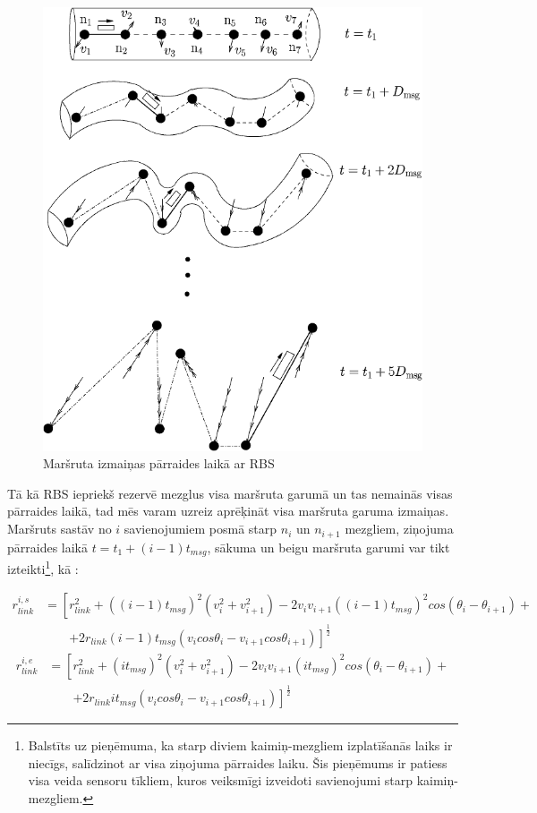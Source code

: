 \begin{figure}
\centering
\includegraphics[scale=0.40]{./graph/dpRBS.png}
\caption{Maršruta izmaiņas pārraides laikā ar RBS \cite{qoS_mobility}}
\label{fig:dpRBS}
\end{figure}

Tā kā RBS iepriekš rezervē mezglus visa maršruta garumā un tas nemainās visas pārraides laikā, tad mēs varam uzreiz aprēķināt visa maršruta garuma izmaiņas. Maršruts sastāv no $i$ savienojumiem posmā starp $n_{i}$ un $n_{i+1}$ mezgliem, ziņojuma pārraides laikā $t = t_{1}+(i-1)t_{msg}$, sākuma un beigu maršruta garumi var tikt izteikti\footnote{Balstīts uz pieņēmuma, ka starp diviem kaimiņ-mezgliem izplatīšanās laiks ir niecīgs, salīdzinot ar visa ziņojuma pārraides laiku. Šis pieņēmums ir patiess visa veida sensoru tīkliem, kuros veiksmīgi izveidoti savienojumi starp kaimiņ-mezgliem.}, kā \cite{qoS_mobility}:

\begin{align}
  r_{link}^{i,s} &= \left[ r_{link}^{2} + ((i-1)t_{msg})^{2}(v_{i}^{2} + v_{i+1}^{2})-2v_{i}v_{i+1}((i-1)t_{msg})^{2}cos(\theta_{i}-\theta_{i+1})+ \right.\nonumber \\
    &\qquad {} \left.  +2r_{link}(i-1)t_{msg}(v_{i}cos\theta_{i}-v_{i+1}cos\theta_{i+1})\right]^{\frac{1}{2}} 	\nonumber
\end{align}
\begin{align}
  r_{link}^{i,e} &=\left[ r_{link}^{2} + (it_{msg})^{2}(v_{i}^{2} + v_{i+1}^{2})- 2v_{i}v_{i+1}(it_{msg})^{2}cos(\theta_{i}-\theta_{i+1})+ \right.\nonumber \\
     &\qquad {} \left.  +2r_{link}i t_{msg}(v_{i}cos\theta_{i} - v_{i+1}cos\theta_{i+1}) \right]^{\frac{1}{2}}  \nonumber
\end{align}

